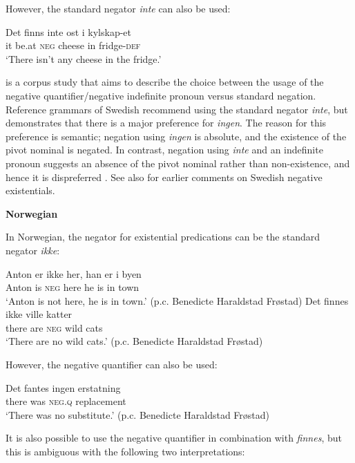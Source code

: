 ﻿\documentclass[output=paper]{langsci/langscibook}
\begin{document}
\begin{unindented}
However, the standard negator \textit{inte} can also be used:
%
\begin{exe}\ex \gll Det finns inte ost i  kylskap-et \\
it be.at \textsc{neg} cheese in fridge-\textsc{def} \\
\glt `There isn't any cheese in the fridge.' \citep[115]{Veselinova2013}
    \end{exe}

\citet{Bordal2017} is a corpus study that aims to describe the choice
between the usage of the negative quantifier\slash negative indefinite
pronoun versus standard negation. Reference grammars of Swedish recommend
using the standard negator \textit{inte}, but \textcite[15ff]{Bordal2017} demonstrates that there is a major preference for \textit{ingen}. The reason for this preference is semantic; negation using \textit{ingen} is absolute, and the existence of the pivot nominal is negated. In contrast, negation using \textit{inte} and an indefinite pronoun suggests an absence of the pivot nominal rather than non-existence, and hence it is dispreferred \citep[21--22]{Bordal2017}. See also \citet[114--115]{Veselinova2013} for earlier comments on Swedish negative existentials.

\textbf{Norwegian}

In Norwegian, the negator for existential predications can be the standard negator \textit{ikke}:
%
\begin{exe}\ex \gll Anton er ikke her, han er i byen  \\
Anton is \textsc{neg} here he is in town \\
    \glt `Anton is not here, he is in town.' (p.c. Benedicte Haraldstad Frøstad)
\ex \gll Det finnes ikke ville  katter \\
there are \textsc{neg} wild cats \\
    \glt `There are no wild cats.' (p.c. Benedicte Haraldstad Frøstad)
    \end{exe}

However, the negative quantifier can also be used:
%
\begin{exe}\ex \gll Det fantes ingen   erstatning \\
there was    \textsc{neg.q}  replacement \\
    \glt `There was no substitute.' (p.c. Benedicte Haraldstad Frøstad)
    \end{exe}

It is also possible to use the negative quantifier in combination with \textit{finnes}, but this is ambiguous with the following two interpretations:


\end{unindented}
\end{document}
